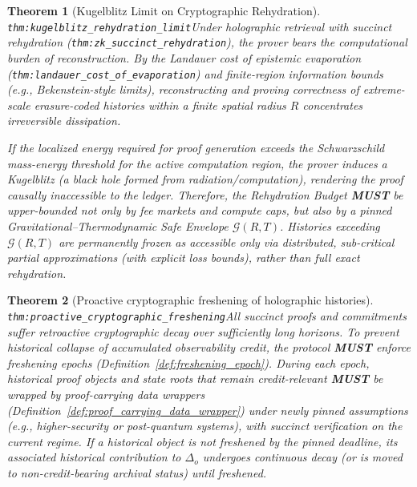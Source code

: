 \documentclass[11pt]{article}
\theoremstyle{definition}
\theoremstyle{plain}
\newtheorem{theorem}{Theorem}
\newcommand{\MUST}{\textbf{MUST}}
\newcommand{\lbl}[1]{\texttt{\footnotesize\nolinkurl{#1}}}
\newcommand{\DefLabel}[1]{\hfill{\small\lbl{#1}}}
\newcommand{\deltao}{\Delta_o}
\begin{document}
\begin{theorem}[Kugelblitz Limit on Cryptographic Rehydration]\DefLabel{thm:kugelblitz_rehydration_limit}\label{thm:kugelblitz_rehydration_limit}
Under holographic retrieval with succinct rehydration (\lbl{thm:zk_succinct_rehydration}), the prover bears the computational burden of reconstruction.
By the Landauer cost of epistemic evaporation (\lbl{thm:landauer_cost_of_evaporation}) and finite-region information bounds (e.g., Bekenstein-style limits), reconstructing and proving correctness of extreme-scale erasure-coded histories within a finite spatial radius $R$ concentrates irreversible dissipation.

If the localized energy required for proof generation exceeds the Schwarzschild mass-energy threshold for the active computation region, the prover induces a \emph{Kugelblitz} (a black hole formed from radiation/computation), rendering the proof causally inaccessible to the ledger.
Therefore, the Rehydration Budget \MUST{} be upper-bounded not only by fee markets and compute caps, but also by a pinned \emph{Gravitational--Thermodynamic Safe Envelope} $\mathcal{G}(R,T)$.
Histories exceeding $\mathcal{G}(R,T)$ are permanently frozen as accessible only via distributed, sub-critical partial approximations (with explicit loss bounds), rather than full exact rehydration.
\end{theorem}

\begin{theorem}[Proactive cryptographic freshening of holographic histories]\DefLabel{thm:proactive_cryptographic_freshening}\label{thm:proactive_cryptographic_freshening}
All succinct proofs and commitments suffer retroactive cryptographic decay over sufficiently long horizons.
To prevent historical collapse of accumulated observability credit, the protocol \MUST{} enforce freshening epochs (Definition~\ref{def:freshening_epoch}).
During each epoch, historical proof objects and state roots that remain credit-relevant \MUST{} be wrapped by proof-carrying data wrappers (Definition~\ref{def:proof_carrying_data_wrapper}) under newly pinned assumptions (e.g., higher-security or post-quantum systems), with succinct verification on the current regime.
If a historical object is not freshened by the pinned deadline, its associated historical contribution to $\deltao$ undergoes continuous decay (or is moved to non-credit-bearing archival status) until freshened.
\end{theorem}
\end{document}
